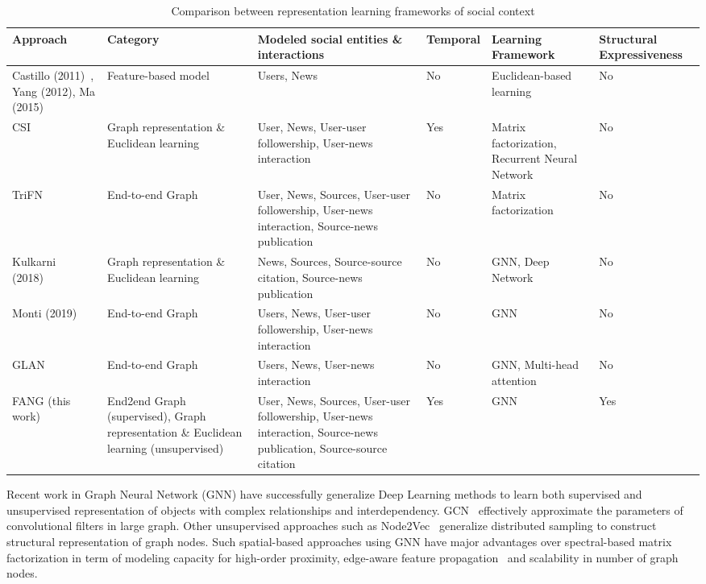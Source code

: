 \documentclass[fyp]{socreport}
\theoremstyle{definition}
\theoremstyle{hypothesis}
\begin{document}
\begin{table}[t]
  \centering
  \tiny
  \begin{tabular}{|p{4cm}|p{2.5cm}|p{4cm}|p{1cm}|p{2cm}|p{1cm}|}
    \hline
    Approach & Category & Modeled social entities \& interactions & Temporal & Learning Framework & Structural Expressiveness \\ \hline \hline
    Castillo (2011)~\cite{castillo2011information}, Yang (2012), Ma (2015)~\cite{ma2015detect}~\cite{yang2012automatic} & Feature-based model & Users, News & No & Euclidean-based learning & No \\ \hline
    CSI~\cite{ruchansky2017csi} & Graph representation \& Euclidean learning & User, News, User-user followership, User-news interaction & Yes & Matrix factorization, Recurrent Neural Network & No \\ \hline
    TriFN~\cite{shu2019beyond} & End-to-end Graph & User, News, Sources, User-user followership, User-news interaction, Source-news publication & No & Matrix factorization & No \\ \hline
    Kulkarni (2018)~\cite{kulkarni2018multi} & Graph representation \& Euclidean learning & News, Sources, Source-source citation, Source-news publication & No & GNN, Deep Network  & No \\ \hline
    Monti (2019)~\cite{monti2019fake} & End-to-end Graph & Users, News, User-user followership, User-news interaction & No & GNN & No \\ \hline
    GLAN~\cite{yuan2019jointly} & End-to-end Graph & Users, News, User-news interaction & No & GNN, Multi-head attention & No \\ \hline \hline
    FANG (this work) & End2end Graph (supervised), Graph representation \& Euclidean learning (unsupervised) & User, News, Sources, User-user followership, User-news interaction, Source-news publication, Source-source citation & Yes & GNN & Yes \\ \hline
    
  \end{tabular}
  \caption{Comparison between representation learning frameworks of social context}
  \label{table:literature_review}
\end{table}
Recent work in Graph Neural Network (GNN) have successfully generalize Deep Learning methods to learn both supervised and unsupervised representation of objects with complex relationships and interdependency. GCN~\cite{kipf2016semi} effectively approximate the parameters of convolutional filters in large graph. Other unsupervised approaches such as Node2Vec~\cite{grover2016node2vec} generalize distributed sampling to construct structural representation of graph nodes. Such spatial-based approaches using GNN have major advantages over spectral-based matrix factorization in term of modeling capacity for high-order proximity, edge-aware feature  propagation~\cite{velivckovic2017graph} and scalability in number of graph nodes.
\end{document}
